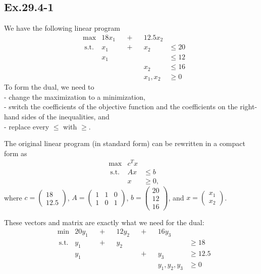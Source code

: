\subsection*{Ex.29.4-1}

We have the following linear program
$$
\begin{aligned}
 & \max & 18x_1 && + && 12.5x_2 & 
\\
 & \ \text{s.t.} & x_1 && + && x_2 & \leq 20
\\
 & & x_1 && && & \leq 12
\\
 & & && && x_2 & \leq 16
\\
 & & && && x_1,x_2 & \geq 0
\end{aligned}
$$
To form the dual, we need to 
\\
- change the maximization to a minimization,
\\
- switch the coefficients of the objective function and the coefficients on the right-hand sides of the inequalities, and
\\
- replace every $\leq$ with $\geq$.

The original linear program (in standard form) can be rewritten in a compact form as
$$
\begin{aligned}
 & \max & c^Tx & 
\\
 & \ \text{s.t.} & Ax & \leq b
\\
 & & x & \geq 0,
\end{aligned}
$$
where $c=\begin{pmatrix}18 \\12.5 \end{pmatrix}$, $A=\begin{pmatrix}1 & 1 & 0 \\1 & 0 & 1 \end{pmatrix}$, $b=\begin{pmatrix}20 \\12 \\16 \end{pmatrix}$, and $x=\begin{pmatrix}x_1 \\x_2 \end{pmatrix}$.

These vectors and matrix are exactly what we need for the dual:
$$
\begin{aligned}
 & \min & 20y_1 && + && 12y_2 && + && 16y_3 & 
\\
 & \ \text{s.t.} & y_1 && + && y_2 && && & \geq 18
\\
 & & y_1 && && && + && y_3 & \geq 12.5
\\
 & & && && && && y_1,y_2,y_3 & \geq 0
\end{aligned}
$$